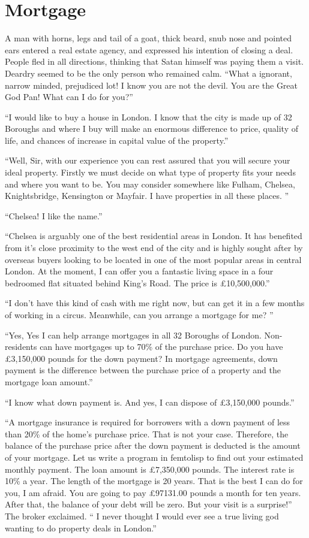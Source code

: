 \documentclass[a4paper,12pt]{book}
\begin{document}
\section{Mortgage}
A man with horns, legs and tail of a goat,
thick beard, snub nose and pointed ears entered
a real estate agency, and expressed his intention
of closing a deal. People fled in all directions,
thinking that Satan himself was paying them a visit.
Deardry seemed to be the only person who remained
calm. “What a ignorant, narrow minded, prejudiced
lot! I know you are not the devil. You are the
Great God Pan! What can I do for you?”

“I would like to buy a house in London.
I know that the city is made up of 32 Boroughs
and where I buy will make an enormous difference
to price, quality of life, and chances of increase
in capital value of the property.”

“Well, Sir, with our experience you can rest
assured that you will secure your ideal property.
Firstly we must decide on what type of property
fits your needs and where you want to be. You
may consider somewhere like Fulham, Chelsea,
Knightsbridge, Kensington or Mayfair.
I have properties in all these places. ”

“Chelsea! I like the name.”

“Chelsea is arguably one of the best residential
areas in London. It has benefited from it’s close
proximity to the west end of the city and is highly
sought after by overseas buyers looking to be located
in one of the most popular areas in central London.
At the moment, I can offer you a fantastic living
space in a four bedroomed flat situated behind
King's Road. The price is £10,500,000.”

“I don't have this kind of cash with me right now,
but can get it in a few months of working in a
circus. Meanwhile, can you arrange a mortgage for me? ”

“Yes, Yes I can help arrange mortgages in all 32 Boroughs
of London. Non-residents can have mortgages up to 70\% of
the purchase price. Do you have £3,150,000 pounds for the
down payment? In mortgage agreements, down payment is
the difference between the purchase price of a property
and the mortgage loan amount.”

“I know what down payment is. And yes, I can dispose
of £3,150,000 pounds.”

“A mortgage insurance is required for borrowers with
a down payment of less than 20\% of the home's purchase
price. That is not your case. Therefore, the balance of
the purchase price after the down payment is deducted
is the amount of your mortgage. Let us write a program
in femtolisp to find out your estimated monthly payment.
The loan amount is £7,350,000 pounds. The interest rate
is 10\% a year. The length of the mortgage is 20 years.
That is the best I can do for you, I am afraid.
You are going to pay £97131.00 pounds a month for
ten years. After that, the balance of your debt
will be zero. But your visit is a surprise!”
The broker exclaimed. “ I never thought I would
ever see a true living god wanting to do property
deals in London.”
\end{document}
